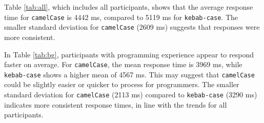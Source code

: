 \documentclass[unicode,11pt,a4paper,oneside,numbers=endperiod,openany]{scrartcl}
\begin{document}
Table \ref{tab:all}, which includes all participants, shows that the average response time for \texttt{camelCase} is 4442 ms, compared to 5119 ms for \texttt{kebab-case}. The smaller standard deviation for \texttt{camelCase} (2609 ms) suggests that responses were more consistent. \\


\begin{table}[h!]
    \centering
    \caption{Descriptive Statistics of Participants with a Programming Background}
    \label{tab:bg}
    {
    }
\end{table}

In Table \ref{tab:bg}, participants with programming experience appear to respond faster on average. For \texttt{camelCase}, the mean response time is 3969 ms, while \texttt{kebab-case} shows a higher mean of 4567 ms. This may suggest that \texttt{camelCase} could be slightly easier or quicker to process for programmers. The smaller standard deviation for \texttt{camelCase} (2113 ms) compared to \texttt{kebab-case} (3290 ms) indicates more consistent response times, in line with the trends for all participants.
\\

\begin{table}[h!]
    \centering
    \caption{Descriptive Statistics of Participants without a Programming Background}
    \label{tab:nobg}
    { }
\end{table}
\end{document}
